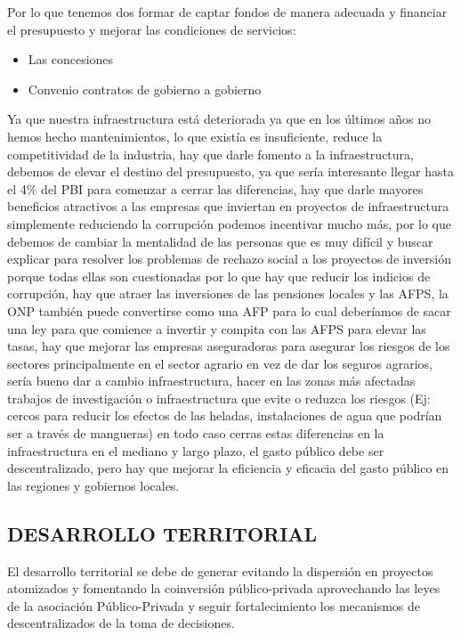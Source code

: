 \documentclass[
  a4paper,
]{article}
\providecommand{\tightlist}{%
  \setlength{\itemsep}{0pt}\setlength{\parskip}{0pt}}\usepackage{longtable,booktabs,array}
\begin{document}
Por lo que tenemos dos formar de captar fondos de manera adecuada y
financiar el presupuesto y mejorar las condiciones de servicios:

\begin{itemize}
\tightlist
\item
  Las concesiones
\item
  Convenio contratos de gobierno a gobierno
\end{itemize}

Ya que nuestra infraestructura está deteriorada ya que en los últimos
años no hemos hecho mantenimientos, lo que existía es insuficiente,
reduce la competitividad de la industria, hay que darle fomento a la
infraestructura, debemos de elevar el destino del presupuesto, ya que
sería interesante llegar hasta el 4\% del PBI para comenzar a cerrar las
diferencias, hay que darle mayores beneficios atractivos a las empresas
que inviertan en proyectos de infraestructura simplemente reduciendo la
corrupción podemos incentivar mucho más, por lo que debemos de cambiar
la mentalidad de las personas que es muy difícil y buscar explicar para
resolver los problemas de rechazo social a los proyectos de inversión
porque todas ellas son cuestionadas por lo que hay que reducir los
indicios de corrupción, hay que atraer las inversiones de las pensiones
locales y las AFPS, la ONP también puede convertirse como una AFP para
lo cual deberíamos de sacar una ley para que comience a invertir y
compita con las AFPS para elevar las tasas, hay que mejorar las empresas
aseguradoras para asegurar los riesgos de los sectores principalmente en
el sector agrario en vez de dar los seguros agrarios, sería bueno dar a
cambio infraestructura, hacer en las zonas más afectadas trabajos de
investigación o infraestructura que evite o reduzca los riesgos (Ej:
cercos para reducir los efectos de las heladas, instalaciones de agua
que podrían ser a través de mangueras) en todo caso cerras estas
diferencias en la infraestructura en el mediano y largo plazo, el gasto
público debe ser descentralizado, pero hay que mejorar la eficiencia y
eficacia del gasto público en las regiones y gobiernos locales.

\hypertarget{desarrollo-territorial}{%
\subsection{DESARROLLO TERRITORIAL}\label{desarrollo-territorial}}

El desarrollo territorial se debe de generar evitando la dispersión en
proyectos atomizados y fomentando la coinversión público-privada
aprovechando las leyes de la asociación Público-Privada y seguir
fortalecimiento los mecanismos de descentralizados de la toma de
decisiones.
\end{document}
